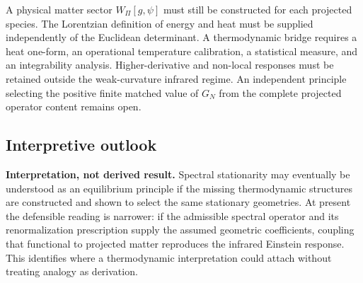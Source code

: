 \documentclass[12pt,a4paper]{article}
\theoremstyle{definition}
\begin{document}
      A physical matter sector $W_\Pi[g,\psi]$ must still be constructed for each projected species.
      The Lorentzian definition of energy and heat must be supplied independently of the Euclidean determinant.
      A thermodynamic bridge requires a heat one-form, an operational temperature calibration, a statistical measure,
      and an integrability analysis.
      Higher-derivative and non-local responses must be retained outside the weak-curvature infrared regime.
      An independent principle selecting the positive finite matched value of $G_N$ from the complete projected
      operator content remains open.

    \subsection{Interpretive outlook}
      \label{subsec:outlook}

      \textbf{Interpretation, not derived result.}
      Spectral stationarity may eventually be understood as an equilibrium principle if the missing thermodynamic
      structures are constructed and shown to select the same stationary geometries.
      At present the defensible reading is narrower: if the admissible spectral operator and its renormalization
      prescription supply the assumed geometric coefficients, coupling that functional to projected matter
      reproduces the infrared Einstein response.
      This identifies where a thermodynamic interpretation could attach without treating analogy as derivation.

  
  
\end{document}

